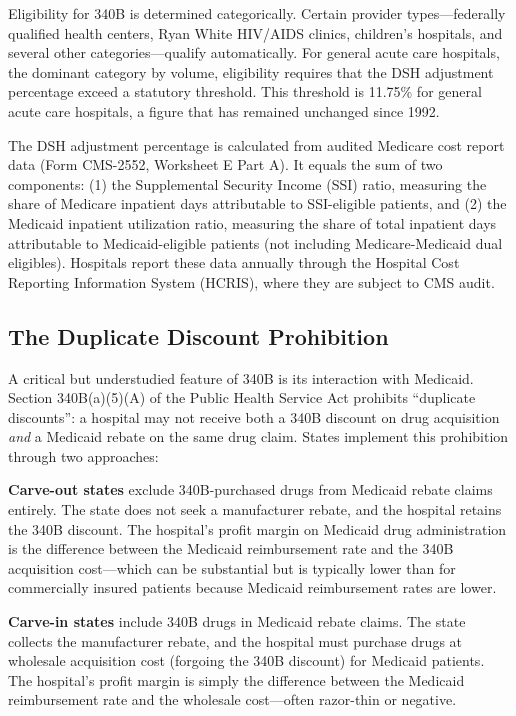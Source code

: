 \documentclass[12pt]{article}
\begin{document}
Eligibility for 340B is determined categorically. Certain provider types---federally qualified health centers, Ryan White HIV/AIDS clinics, children's hospitals, and several other categories---qualify automatically. For general acute care hospitals, the dominant category by volume, eligibility requires that the DSH adjustment percentage exceed a statutory threshold. This threshold is 11.75\% for general acute care hospitals, a figure that has remained unchanged since 1992.

The DSH adjustment percentage is calculated from audited Medicare cost report data (Form CMS-2552, Worksheet E Part A). It equals the sum of two components: (1) the Supplemental Security Income (SSI) ratio, measuring the share of Medicare inpatient days attributable to SSI-eligible patients, and (2) the Medicaid inpatient utilization ratio, measuring the share of total inpatient days attributable to Medicaid-eligible patients (not including Medicare-Medicaid dual eligibles). Hospitals report these data annually through the Hospital Cost Reporting Information System (HCRIS), where they are subject to CMS audit.

\subsection{The Duplicate Discount Prohibition}

A critical but understudied feature of 340B is its interaction with Medicaid. Section 340B(a)(5)(A) of the Public Health Service Act prohibits ``duplicate discounts'': a hospital may not receive both a 340B discount on drug acquisition \textit{and} a Medicaid rebate on the same drug claim. States implement this prohibition through two approaches:

\textbf{Carve-out states} exclude 340B-purchased drugs from Medicaid rebate claims entirely. The state does not seek a manufacturer rebate, and the hospital retains the 340B discount. The hospital's profit margin on Medicaid drug administration is the difference between the Medicaid reimbursement rate and the 340B acquisition cost---which can be substantial but is typically lower than for commercially insured patients because Medicaid reimbursement rates are lower.

\textbf{Carve-in states} include 340B drugs in Medicaid rebate claims. The state collects the manufacturer rebate, and the hospital must purchase drugs at wholesale acquisition cost (forgoing the 340B discount) for Medicaid patients. The hospital's profit margin is simply the difference between the Medicaid reimbursement rate and the wholesale cost---often razor-thin or negative.
\end{document}
